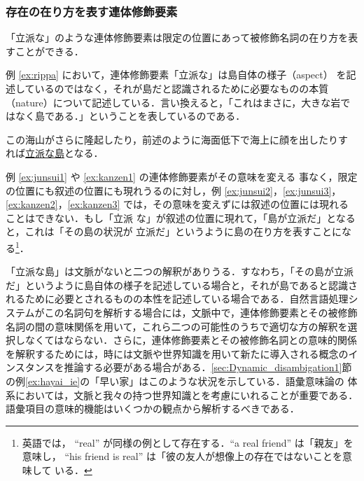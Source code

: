 \subsubsection{存在の在り方を表す連体修飾要素}
\label{sec:state_of_being}

「立派な」のような連体修飾要素は限定の位置にあって被修飾名詞の在り方を表
すことができる．

例 \ref{ex:rippa} において，連体修飾要素「立派な」は島自体の様子（aspect）
を記述しているのではなく，それが島だと認識されるために必要なものの本質
（nature）について記述している．言い換えると，「これはまさに，大きな岩で
はなく島である．」ということを表しているのである．

\begin{exx}\rm
  \label{ex:rippa}
  \hspace*{.4cm} 
  この海山がさらに隆起したり，前述のように海面低下で海上に顔を出したりす\\
  \q\q\q れば\underline{立派な島}となる．
\end{exx}

\newpage

例 \ref{ex:junsui1} や \ref{ex:kanzen1} の連体修飾要素がその意味を変える
事なく，限定の位置にも叙述の位置にも現れうるのに対し，例 
\ref{ex:junsui2}，\ref{ex:junsui3}， \ref{ex:kanzen2}，\ref{ex:kanzen3} 
では，その意味を変えずには叙述の位置には現れることはできない．もし「立派
な」が叙述の位置に現れて，「島が立派だ」となると，これは「その島の状況が
立派だ」というように島の在り方を表すことになる\footnote{英語では，
``real'' が同様の例として存在する．``a real friend'' は「親友」を意味し，
``his friend is real'' は「彼の友人が想像上の存在ではないことを意味して
いる．}．  

「立派な島」は文脈がないと二つの解釈がありうる．すなわち，「その島が立派
だ」というように島自体の様子を記述している場合と，それが島であると認識さ
れるために必要とされるものの本性を記述している場合である．自然言語処理シ
ステムがこの名詞句を解析する場合には，文脈中で，連体修飾要素とその被修飾
名詞の間の意味関係を用いて，これら二つの可能性のうちで適切な方の解釈を選
択しなくてはならない．さらに，連体修飾要素とその被修飾名詞との意味的関係
を解釈するためには，時には文脈や世界知識を用いて新たに導入される概念のイ
ンスタンスを推論する必要がある場合がある．\ref{sec:Dynamic_disambigation1}節
の例\ref{ex:hayai_ie}の「早い家」はこのような状況を示している．語彙意味論の
体系においては，文脈と我々の持つ世界知識とを考慮にいれることが重要である．
語彙項目の意味的機能はいくつかの観点から解析するべきである．


